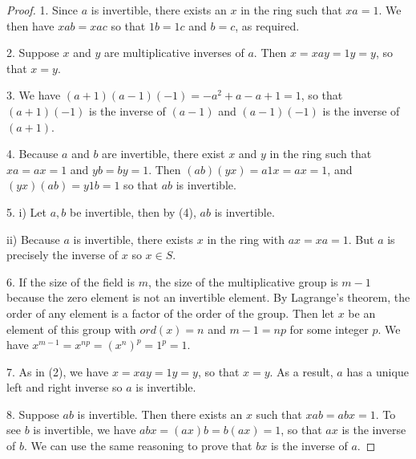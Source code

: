 \begin{proof}
1. Since $a$ is invertible, there exists an $x$ in the ring such that $xa=1$. We then have $xab=xac$ so that $1b=1c$ and $b=c$, as required.

2. Suppose $x$ and $y$ are multiplicative inverses of $a$. Then $x=xay=1y=y$, so that $x=y$.

3. We have $(a+1)(a-1)(-1)= -a^{2}+a-a+1= 1$, so that $(a+1)(-1)$ is the inverse of $(a-1)$ and $(a-1)(-1)$ is the inverse of $(a+1)$.

4. Because $a$ and $b$ are invertible, there exist $x$ and $y$ in the ring such that $xa=ax=1$ and $yb=by=1$. Then $(ab)(yx)=a1x=ax=1$, and $(yx)(ab)=y1b=1$ so that $ab$ is invertible.

5. i) Let $a,b$ be invertible, then by (4), $ab$ is invertible.

ii) Because $a$ is invertible, there exists $x$ in the ring with $ax=xa=1$. But $a$ is precisely the inverse of $x$ so $x\in S$.

6. If the size of the field is $m$, the size of the multiplicative group is $m-1$ because the zero element is not an invertible element. By Lagrange’s theorem, the order of any element is a factor of the order of the group. Then let $x$ be an element of this group with $ord(x)=n$ and $m-1=np$ for some integer $p$. We have $x^{m-1}=x^{np}=(x^{n})^{p}=1^{p}=1$.

7. As in (2), we have $x=xay=1y=y$, so that $x=y$. As a result, $a$ has a unique left and right inverse so $a$ is invertible.

8. Suppose $ab$ is invertible. Then there exists an $x$ such that $xab=abx=1$. To see $b$ is invertible, we have $abx=(ax)b=b(ax)=1$, so that $ax$ is the inverse of $b$. We can use the same reasoning to prove that $bx$ is the inverse of $a$.
\end{proof}


